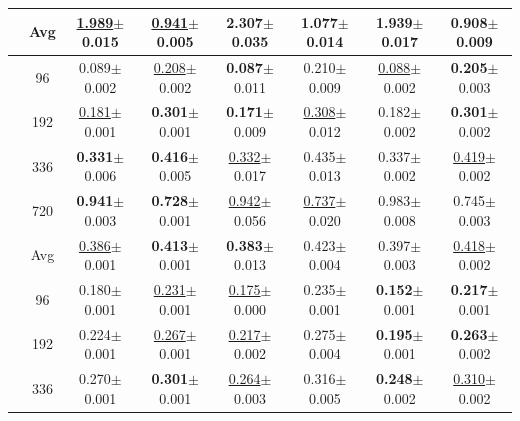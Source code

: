 \begin{table}[t]
{\begin{tabular}{c|c|cc|cc|cc}
\cmidrule(lr){2-8}
 & Avg & \underline{1.989}{\scriptsize$\pm$0.015} & \underline{0.941}{\scriptsize$\pm$0.005} & 2.307{\scriptsize$\pm$0.035} & 1.077{\scriptsize$\pm$0.014} & \textbf{1.939}{\scriptsize$\pm$0.017} & \textbf{0.908}{\scriptsize$\pm$0.009} \\
\midrule
{} & 96 & 0.089{\scriptsize$\pm$0.002} & \underline{0.208}{\scriptsize$\pm$0.002} & \textbf{0.087}{\scriptsize$\pm$0.011} & 0.210{\scriptsize$\pm$0.009} & \underline{0.088}{\scriptsize$\pm$0.002} & \textbf{0.205}{\scriptsize$\pm$0.003} \\
 & 192 & \underline{0.181}{\scriptsize$\pm$0.001} & \textbf{0.301}{\scriptsize$\pm$0.001} & \textbf{0.171}{\scriptsize$\pm$0.009} & \underline{0.308}{\scriptsize$\pm$0.012} & 0.182{\scriptsize$\pm$0.002} & \textbf{0.301}{\scriptsize$\pm$0.002} \\
 & 336 & \textbf{0.331}{\scriptsize$\pm$0.006} & \textbf{0.416}{\scriptsize$\pm$0.005} & \underline{0.332}{\scriptsize$\pm$0.017} & 0.435{\scriptsize$\pm$0.013} & 0.337{\scriptsize$\pm$0.002} & \underline{0.419}{\scriptsize$\pm$0.002} \\
 & 720 & \textbf{0.941}{\scriptsize$\pm$0.003} & \textbf{0.728}{\scriptsize$\pm$0.001} & \underline{0.942}{\scriptsize$\pm$0.056} & \underline{0.737}{\scriptsize$\pm$0.020} & 0.983{\scriptsize$\pm$0.008} & 0.745{\scriptsize$\pm$0.003} \\
\cmidrule(lr){2-8}
 & Avg & \underline{0.386}{\scriptsize$\pm$0.001} & \textbf{0.413}{\scriptsize$\pm$0.001} & \textbf{0.383}{\scriptsize$\pm$0.013} & 0.423{\scriptsize$\pm$0.004} & 0.397{\scriptsize$\pm$0.003} & \underline{0.418}{\scriptsize$\pm$0.002} \\
\midrule
{} & 96 & 0.180{\scriptsize$\pm$0.001} & \underline{0.231}{\scriptsize$\pm$0.001} & \underline{0.175}{\scriptsize$\pm$0.000} & 0.235{\scriptsize$\pm$0.001} & \textbf{0.152}{\scriptsize$\pm$0.001} & \textbf{0.217}{\scriptsize$\pm$0.001} \\
 & 192 & 0.224{\scriptsize$\pm$0.001} & \underline{0.267}{\scriptsize$\pm$0.001} & \underline{0.217}{\scriptsize$\pm$0.002} & 0.275{\scriptsize$\pm$0.004} & \textbf{0.195}{\scriptsize$\pm$0.001} & \textbf{0.263}{\scriptsize$\pm$0.002} \\
 & 336 & 0.270{\scriptsize$\pm$0.001} & \textbf{0.301}{\scriptsize$\pm$0.001} & \underline{0.264}{\scriptsize$\pm$0.003} & 0.316{\scriptsize$\pm$0.005} & \textbf{0.248}{\scriptsize$\pm$0.002} & \underline{0.310}{\scriptsize$\pm$0.002} \\

\end{tabular}}
\end{table}
